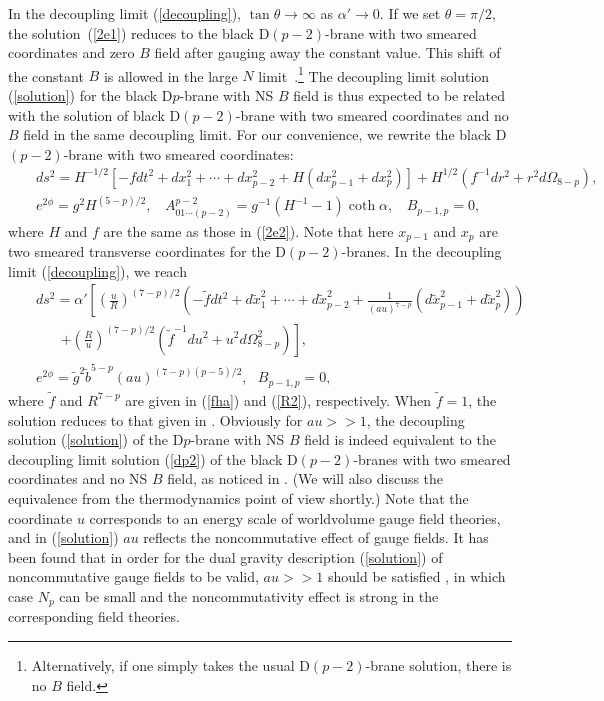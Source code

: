 \documentclass[a4paper,12pt]{article}
\begin{document}
In the decoupling limit (\ref{decoupling}), $\tan\theta \to \infty$ as
$\alpha' \to 0$. If we set $\theta = \pi/2$, the solution~(\ref{2e1})
reduces to the black D$(p-2)$-brane with two smeared coordinates and zero
$B$ field after gauging away the constant value. This shift of the constant
$B$ is allowed in the large $N$ limit~\cite{BS}.\footnote{Alternatively, if
one simply takes the usual D$(p-2)$-brane solution, there is no $B$ field.}
The decoupling limit solution (\ref{solution}) for the black D$p$-brane
with NS $B$ field is thus expected to be related with the solution of black
D$(p-2)$-brane with two smeared coordinates and no $B$ field in the same
decoupling limit. For our convenience, we rewrite the black D$(p-2)$-brane
with two smeared coordinates:
\begin{eqnarray}
&& ds^2 =H^{-1/2}[-fdt^2 +dx_1^2 +\cdots +dx_{p-2}^2 +H (dx_{p-1}^2
 +dx_p^2)] +H^{1/2}(f^{-1}dr^2 +r^2d\Omega_{8-p}), \nonumber\\
&& e^{2\phi}=g^2H^{(5-p)/2}, \ \ \ \
 A^{p-2}_{01\cdots (p-2)} =g^{-1}(H^{-1}-1)\coth\alpha ,\ \ \ \
 B_{p-1,p}=0,
\end{eqnarray}
where $H$ and $f$ are the same as those in (\ref{2e2}). Note that here
$x_{p-1}$ and $x_p$ are two smeared transverse coordinates for the
D$(p-2)$-branes. In the decoupling limit (\ref{decoupling}), we reach
\begin{eqnarray}
&& ds^2=\alpha'\left [\left(\frac{u}{R}\right)^{(7-p)/2}\left (-\tilde {f}
    dt^2 + d\tilde{x}_1^2 +\cdots +d\tilde{x}_{p-2}^2
    + \frac{1}{(au)^{7-p}}(d\tilde{x}_{p-1}^2 + d\tilde{x}_p^2)\right)
     \right. \nonumber \\
&&~~~~~~~~\left. + \left(\frac{R}{u}\right)^{(7-p)/2}
       \left(\tilde{f}^{-1}du^2
   + u^2 d\Omega^2_{8-p}\right)\right], \nonumber\\
\label{dp2}
&& e^{2\phi} = \tilde{g}^2 \tilde{b}^{5-p}(au)^{(7-p)(p-5)/2},
\ \ \ B_{p-1,p}=0,
\end{eqnarray}
where $\tilde{f}$ and $R^{7-p}$ are given in (\ref{fha}) and (\ref{R2}),
respectively. When $\tilde{f}=1$, the solution reduces to that given
in \cite{Lu}. Obviously for $au >>1$, the decoupling solution (\ref{solution})
of the D$p$-brane with NS $B$ field is indeed equivalent to the decoupling
limit solution (\ref{dp2}) of the black D$(p-2)$-branes with two smeared
coordinates and no NS $B$ field, as noticed in \cite{Lu}. (We will also
discuss the equivalence from the thermodynamics point of view shortly.)
Note that the coordinate $u$ corresponds to an energy scale of worldvolume
gauge field theories, and in (\ref{solution}) $au$ reflects the noncommutative
effect of gauge fields. It has been
found that in order for the dual gravity description (\ref{solution})
of noncommutative gauge fields to be valid, $au>>1$ should be satisfied
\cite{Lu,Ali}, in which case $N_p$ can be small and the noncommutativity
effect is strong in the corresponding field theories.
\end{document}
